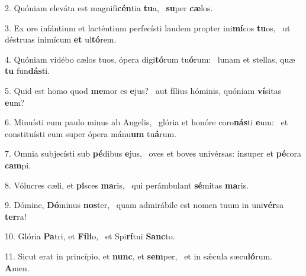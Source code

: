 2. Quóniam eleváta est magnifi\textbf{cén}tia \textbf{tu}a, \ast\  \textbf{su}per \textbf{cæ}los.\

3. Ex ore infántium et lacténtium perfecísti laudem propter ini\textbf{mí}cos \textbf{tu}os, \ast\  ut déstruas inimícum \textbf{et} ul\textbf{tó}rem.\

4. Quóniam vidébo cælos tuos, ópera digi\textbf{tó}rum tu\textbf{ó}rum: \ast\  lunam et stellas, quæ \textbf{tu} fun\textbf{dás}ti.\

5. Quid est homo quod \textbf{me}mor es \textbf{e}jus? \ast\  aut fílius hóminis, quóniam \textbf{ví}sitas \textbf{e}um?\

6. Minuísti eum paulo minus ab Angelis, \dag\  glória et honóre coro\textbf{nás}ti \textbf{e}um: \ast\  et constituísti eum super ópera mánu\textbf{um} tu\textbf{á}rum.\

7. Omnia subjecísti sub \textbf{pé}dibus \textbf{e}jus, \ast\  oves et boves univérsas: ínsuper et \textbf{pé}cora \textbf{cam}pi.\

8. Vólucres cæli, et \textbf{pi}sces \textbf{ma}ris, \ast\  qui perámbulant \textbf{sé}mitas \textbf{ma}ris.\

9. Dómine, \textbf{Dó}minus \textbf{nos}ter, \ast\  quam admirábile est nomen tuum in uni\textbf{vér}sa \textbf{ter}ra!\

10. Glória \textbf{Pa}tri, et \textbf{Fí}\textbf{li}o, \ast\  et Spi\textbf{rí}tui \textbf{Sanc}to.\

11. Sicut erat in princípio, et \textbf{nunc}, et \textbf{sem}per, \ast\  et in sǽcula sæcu\textbf{ló}rum. \textbf{A}men.\

